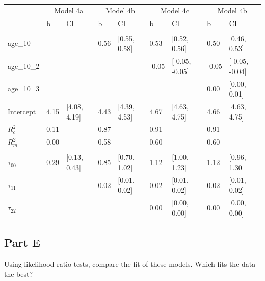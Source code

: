 \documentclass[]{article}
\begin{document}
\begin{table}[H]
\centering
\begin{tabular}{lllllllll}
\toprule
\multicolumn{1}{c}{ } & \multicolumn{2}{c}{Model 4a} & \multicolumn{2}{c}{Model 4b} & \multicolumn{2}{c}{Model 4c} & \multicolumn{2}{c}{Model 4b} \\
\cmidrule(l{2pt}r{2pt}){2-3} \cmidrule(l{2pt}r{2pt}){4-5} \cmidrule(l{2pt}r{2pt}){6-7} \cmidrule(l{2pt}r{2pt}){8-9}
 & b & CI & b & CI & b & CI & b & CI\\
\midrule
\addlinespace[0.3em]
\multicolumn{9}{l}{\textbf{Fixed}}\\
\hspace{1em}age\_10 &  &  & 0.56 & [0.55, 0.58] & 0.53 & [0.52, 0.56] & 0.50 & [0.46, 0.53]\\
\hspace{1em}age\_10\_2 &  &  &  &  & -0.05 & [-0.05, -0.05] & -0.05 & [-0.05, -0.04]\\
\hspace{1em}age\_10\_3 &  &  &  &  &  &  & 0.00 & [0.00, 0.01]\\
\hspace{1em}Intercept & 4.15 & [4.08, 4.19] & 4.43 & [4.39, 4.53] & 4.67 & [4.63, 4.75] & 4.66 & [4.63, 4.75]\\
$R^2_c$ & 0.11 &  & 0.87 &  & 0.91 &  & 0.91 & \\
$R^2_m$ & 0.00 &  & 0.58 &  & 0.60 &  & 0.60 & \\
\addlinespace[0.3em]
\multicolumn{9}{l}{\textbf{Random}}\\
\hspace{1em}$\tau_{00}$ & 0.29 & [0.13, 0.43] & 0.85 & [0.70, 1.02] & 1.12 & [1.00, 1.23] & 1.12 & [0.96, 1.30]\\
\hspace{1em}$\tau_{11}$ &  &  & 0.02 & [0.01, 0.02] & 0.02 & [0.01, 0.02] & 0.02 & [0.01, 0.02]\\
\hspace{1em}$\tau_{22}$ &  &  &  &  & 0.00 & [0.00, 0.00] & 0.00 & [0.00, 0.00]\\
\bottomrule
\end{tabular}
\end{table}

\subsection{Part E}\label{part-e}

Using likelihood ratio tests, compare the fit of these models. Which
fits the data the best?
\end{document}
